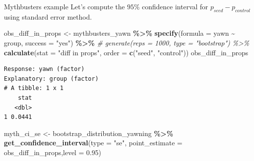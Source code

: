 \documentclass[
  ignorenonframetext,
]{beamer}
\newenvironment{Shaded}{\begin{snugshade}}{\end{snugshade}}
\newcommand{\AttributeTok}[1]{\textcolor[rgb]{0.13,0.29,0.53}{#1}}
\newcommand{\CommentTok}[1]{\textcolor[rgb]{0.56,0.35,0.01}{\textit{#1}}}
\newcommand{\FloatTok}[1]{\textcolor[rgb]{0.00,0.00,0.81}{#1}}
\newcommand{\FunctionTok}[1]{\textcolor[rgb]{0.13,0.29,0.53}{\textbf{#1}}}
\newcommand{\NormalTok}[1]{#1}
\newcommand{\OtherTok}[1]{\textcolor[rgb]{0.56,0.35,0.01}{#1}}
\newcommand{\SpecialCharTok}[1]{\textcolor[rgb]{0.81,0.36,0.00}{\textbf{#1}}}
\newcommand{\StringTok}[1]{\textcolor[rgb]{0.31,0.60,0.02}{#1}}
\begin{document}
\begin{frame}[fragile]{Mythbusters example}
\protect\hypertarget{mythbusters-example-4}{}
Let's compute the \(95\%\) confidence interval for
\(p_{seed}-p_{control}\) using standard error method.

\tiny

\begin{Shaded}
\begin{Highlighting}[]
\NormalTok{obs\_diff\_in\_props }\OtherTok{\textless{}{-}}\NormalTok{ mythbusters\_yawn }\SpecialCharTok{\%\textgreater{}\%} 
  \FunctionTok{specify}\NormalTok{(}\AttributeTok{formula =}\NormalTok{ yawn }\SpecialCharTok{\textasciitilde{}}\NormalTok{ group, }\AttributeTok{success =} \StringTok{"yes"}\NormalTok{) }\SpecialCharTok{\%\textgreater{}\%} 
  \CommentTok{\# generate(reps = 1000, type = "bootstrap") \%\textgreater{}\% }
  \FunctionTok{calculate}\NormalTok{(}\AttributeTok{stat =} \StringTok{"diff in props"}\NormalTok{, }\AttributeTok{order =} \FunctionTok{c}\NormalTok{(}\StringTok{"seed"}\NormalTok{, }\StringTok{"control"}\NormalTok{))}
\NormalTok{obs\_diff\_in\_props}
\end{Highlighting}
\end{Shaded}

\begin{verbatim}
Response: yawn (factor)
Explanatory: group (factor)
# A tibble: 1 x 1
    stat
   <dbl>
1 0.0441
\end{verbatim}

\begin{Shaded}
\begin{Highlighting}[]
\NormalTok{myth\_ci\_se }\OtherTok{\textless{}{-}}\NormalTok{ bootstrap\_distribution\_yawning }\SpecialCharTok{\%\textgreater{}\%} 
  \FunctionTok{get\_confidence\_interval}\NormalTok{(}\AttributeTok{type =} \StringTok{"se"}\NormalTok{, }\AttributeTok{point\_estimate =}\NormalTok{ obs\_diff\_in\_props,}\AttributeTok{level =} \FloatTok{0.95}\NormalTok{)}
\end{Highlighting}
\end{Shaded}

\normalsize
\end{frame}
\end{document}
